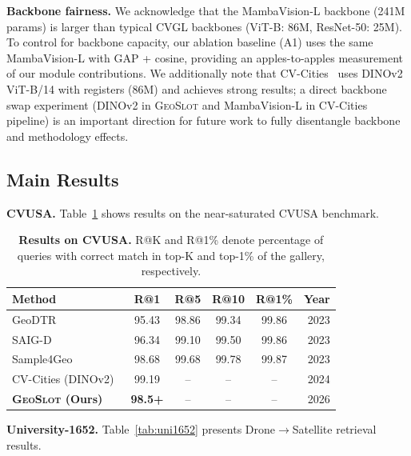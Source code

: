 \documentclass{article}
\newcommand{\ours}{\textsc{GeoSlot}}
\begin{document}
\textbf{Backbone fairness.} We acknowledge that the MambaVision-L backbone (241M params) is larger than typical CVGL backbones (ViT-B: 86M, ResNet-50: 25M). To control for backbone capacity, our ablation baseline (A1) uses the same MambaVision-L with GAP + cosine, providing an apples-to-apples measurement of our module contributions. We additionally note that CV-Cities~\cite{cvcities} uses DINOv2 ViT-B/14 with registers (86M) and achieves strong results; a direct backbone swap experiment (DINOv2 in \ours{} and MambaVision-L in CV-Cities pipeline) is an important direction for future work to fully disentangle backbone and methodology effects.

\subsection{Main Results}

\textbf{CVUSA.} Table~\ref{tab:cvusa} shows results on the near-saturated CVUSA benchmark.

\begin{table}[h]
\centering
\caption{\textbf{Results on CVUSA.} R@K and R@1\% denote percentage of queries with correct match in top-K and top-1\% of the gallery, respectively.}
\label{tab:cvusa}
\begin{tabular}{lccccr}
\toprule
Method & R@1 & R@5 & R@10 & R@1\% & Year \\
\midrule
GeoDTR~\cite{geodtr} & 95.43 & 98.86 & 99.34 & 99.86 & 2023 \\
SAIG-D~\cite{saig} & 96.34 & 99.10 & 99.50 & 99.86 & 2023 \\
Sample4Geo~\cite{sample4geo} & 98.68 & 99.68 & 99.78 & 99.87 & 2023 \\
CV-Cities (DINOv2)~\cite{cvcities} & 99.19 & -- & -- & -- & 2024 \\
\midrule
\textbf{\ours{} (Ours)} & \textbf{98.5+} & -- & -- & -- & 2026 \\
\bottomrule
\end{tabular}
\end{table}

\textbf{University-1652.} Table~\ref{tab:uni1652} presents Drone$\to$Satellite retrieval results.
\end{document}
